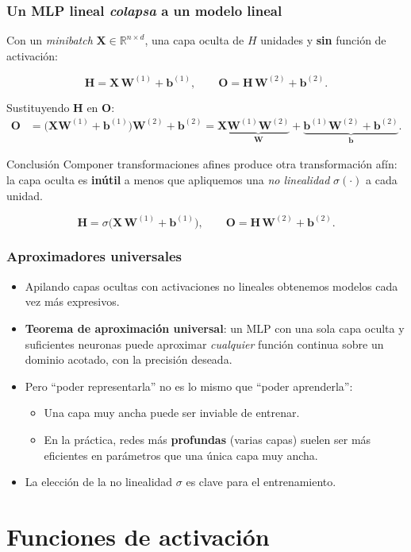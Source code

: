 \documentclass[aspectratio=169, 10pt]{beamer}
\newcommand{\R}{\mathbb{R}}
\newcommand{\W}{\bm{W}}
\newcommand{\bb}{\bm{b}}
\newcommand{\X}{\bm{X}}
\newcommand{\Hb}{\bm{H}}
\newcommand{\Ob}{\bm{O}}
\newcommand{\formula}[1]{%
	\begin{tcolorbox}[colback=UCMBlue!8, colframe=UCMBlue, arc=4pt,
		boxsep=2pt, left=6pt, right=6pt, top=3pt, bottom=3pt]
		#1
	\end{tcolorbox}
}
\begin{document}
\begin{frame}
\frametitle{Un MLP lineal \emph{colapsa} a un modelo lineal}
Con un \emph{minibatch} $\X\in\R^{n\times d}$, una capa oculta de $H$ unidades y \textbf{sin} funci\'on de activaci\'on:
\formula{
\[
\Hb = \X\,\W^{(1)} + \bb^{(1)}, \qquad
\Ob = \Hb\,\W^{(2)} + \bb^{(2)}.
\]}
\pause
Sustituyendo $\Hb$ en $\Ob$:
\begin{align*}
\Ob &= \big(\X\W^{(1)} + \bb^{(1)}\big)\W^{(2)} + \bb^{(2)}
     = \X \underbrace{\W^{(1)}\W^{(2)}}_{\W} + \underbrace{\bb^{(1)}\W^{(2)} + \bb^{(2)}}_{\bb}.
\end{align*}
\pause
\begin{block}{Conclusi\'on}
Componer transformaciones afines produce otra transformaci\'on af\'in: la capa oculta es \textbf{in\'util} a menos que apliquemos una \emph{no linealidad} $\sigma(\cdot)$ a cada unidad.
\end{block}
\pause
\formula{
\[
\Hb = \sigma\!\big(\X\,\W^{(1)} + \bb^{(1)}\big), \qquad
\Ob = \Hb\,\W^{(2)} + \bb^{(2)}.
\]}
\end{frame}

\begin{frame}
\frametitle{Aproximadores universales}
\begin{itemize}
	\item Apilando capas ocultas con activaciones no lineales obtenemos modelos cada vez m\'as expresivos.
	\pause
	\item \textbf{Teorema de aproximaci\'on universal}: un MLP con una sola capa oculta y suficientes neuronas puede aproximar \emph{cualquier} funci\'on continua sobre un dominio acotado, con la precisi\'on deseada.
	\pause
	\item Pero ``poder representarla'' no es lo mismo que ``poder aprenderla'':
	\begin{itemize}
		\item Una capa muy ancha puede ser inviable de entrenar.
		\item En la pr\'actica, redes m\'as \textbf{profundas} (varias capas) suelen ser m\'as eficientes en par\'ametros que una \'unica capa muy ancha.
	\end{itemize}
	\pause
	\item La elecci\'on de la no linealidad $\sigma$ es clave para el entrenamiento.
\end{itemize}
\end{frame}

\section{Funciones de activaci\'on}
\end{document}

